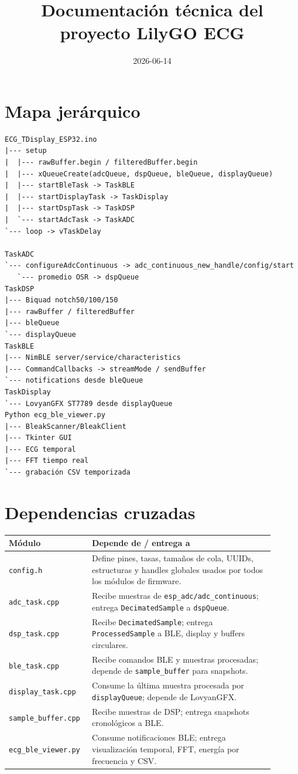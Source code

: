 \documentclass[11pt]{article}
\title{Documentación técnica del proyecto LilyGO ECG}
\date{2026-06-14}
\begin{document}
\maketitle
\section{Mapa jerárquico}
\begin{verbatim}
ECG_TDisplay_ESP32.ino
|--- setup
|  |--- rawBuffer.begin / filteredBuffer.begin
|  |--- xQueueCreate(adcQueue, dspQueue, bleQueue, displayQueue)
|  |--- startBleTask -> TaskBLE
|  |--- startDisplayTask -> TaskDisplay
|  |--- startDspTask -> TaskDSP
|  `--- startAdcTask -> TaskADC
`--- loop -> vTaskDelay

TaskADC
`--- configureAdcContinuous -> adc_continuous_new_handle/config/start
   `--- promedio OSR -> dspQueue
TaskDSP
|--- Biquad notch50/100/150
|--- rawBuffer / filteredBuffer
|--- bleQueue
`--- displayQueue
TaskBLE
|--- NimBLE server/service/characteristics
|--- CommandCallbacks -> streamMode / sendBuffer
`--- notifications desde bleQueue
TaskDisplay
`--- LovyanGFX ST7789 desde displayQueue
Python ecg_ble_viewer.py
|--- BleakScanner/BleakClient
|--- Tkinter GUI
|--- ECG temporal
|--- FFT tiempo real
`--- grabación CSV temporizada
\end{verbatim}

\section{Dependencias cruzadas}
\begin{longtable}{p{0.25\linewidth}p{0.65\linewidth}}
\textbf{Módulo} & \textbf{Depende de / entrega a}\\\hline
\texttt{config.h} & Define pines, tasas, tamaños de cola, UUIDs, estructuras y handles globales usados por todos los módulos de firmware.\\
\texttt{adc\_task.cpp} & Recibe muestras de \texttt{esp\_adc/adc\_continuous}; entrega \texttt{DecimatedSample} a \texttt{dspQueue}.\\
\texttt{dsp\_task.cpp} & Recibe \texttt{DecimatedSample}; entrega \texttt{ProcessedSample} a BLE, display y buffers circulares.\\
\texttt{ble\_task.cpp} & Recibe comandos BLE y muestras procesadas; depende de \texttt{sample\_buffer} para snapshots.\\
\texttt{display\_task.cpp} & Consume la última muestra procesada por \texttt{displayQueue}; depende de LovyanGFX.\\
\texttt{sample\_buffer.cpp} & Recibe muestras de DSP; entrega snapshots cronológicos a BLE.\\
\texttt{ecg\_ble\_viewer.py} & Consume notificaciones BLE; entrega visualización temporal, FFT, energía por frecuencia y CSV.\\
\end{longtable}
\end{document}
